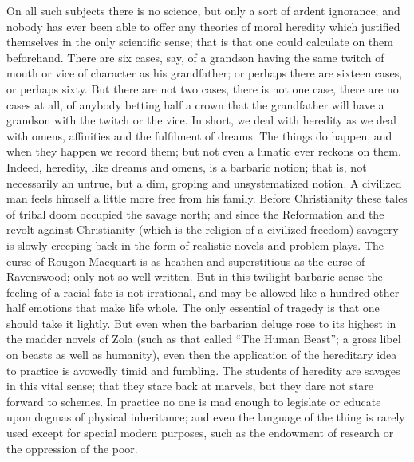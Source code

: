 \documentclass{book}
\begin{document}
On all such subjects there is no science, but only a sort of ardent ignorance; and nobody has ever been able to offer any theories of moral heredity which justified themselves in the only scientific sense; that is that one could calculate on them beforehand. There are six cases, say, of a grandson having the same twitch of mouth or vice of character as his grandfather; or perhaps there are sixteen cases, or perhaps sixty. But there are not two cases, there is not one case, there are no cases at all, of anybody betting half a crown that the grandfather will have a grandson with the twitch or the vice. In short, we deal with heredity as we deal with omens, affinities and the fulfilment of dreams. The things do happen, and when they happen we record them; but not even a lunatic ever reckons on them. Indeed, heredity, like dreams and omens, is a barbaric notion; that is, not necessarily an untrue, but a dim, groping and unsystematized notion. A civilized man feels himself a little more free from his family. Before Christianity these tales of tribal doom occupied the savage north; and since the Reformation and the revolt against Christianity (which is the religion of a civilized freedom) savagery is slowly creeping back in the form of realistic novels and problem plays. The curse of Rougon-Macquart is as heathen and superstitious as the curse of Ravenswood; only not so well written. But in this twilight barbaric sense the feeling of a racial fate is not irrational, and may be allowed like a hundred other half emotions that make life whole. The only essential of tragedy is that one should take it lightly. But even when the barbarian deluge rose to its highest in the madder novels of Zola (such as that called “The Human Beast”; a gross libel on beasts as well as humanity), even then the application of the hereditary idea to practice is avowedly timid and fumbling. The students of heredity are savages in this vital sense; that they stare back at marvels, but they dare not stare forward to schemes. In practice no one is mad enough to legislate or educate upon dogmas of physical inheritance; and even the language of the thing is rarely used except for special modern purposes, such as the endowment of research or the oppression of the poor.
\end{document}
